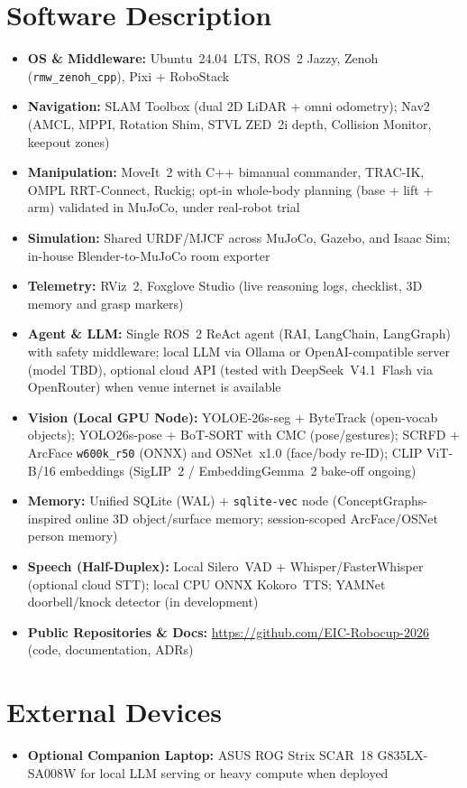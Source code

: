 \vspace{1pt}
\section*{Software Description}
\begin{itemize}[noitemsep,topsep=1pt,leftmargin=1.1em]
    \item \textbf{OS \& Middleware:} Ubuntu~24.04~LTS, ROS~2 Jazzy, Zenoh (\texttt{rmw\_zenoh\_cpp}), Pixi + RoboStack
    \item \textbf{Navigation:} SLAM Toolbox (dual 2D LiDAR + omni odometry); Nav2 (AMCL, MPPI, Rotation Shim, STVL ZED~2i depth, Collision Monitor, keepout zones)
    \item \textbf{Manipulation:} MoveIt~2 with C++ bimanual commander, TRAC-IK, OMPL RRT-Connect, Ruckig; opt-in whole-body planning (base + lift + arm) validated in MuJoCo, under real-robot trial
    \item \textbf{Simulation:} Shared URDF/MJCF across MuJoCo, Gazebo, and Isaac Sim; in-house Blender-to-MuJoCo room exporter
    \item \textbf{Telemetry:} RViz~2, Foxglove Studio (live reasoning logs, checklist, 3D memory and grasp markers)
    \item \textbf{Agent \& LLM:} Single ROS~2 ReAct agent (RAI, LangChain, LangGraph) with safety middleware; local LLM via Ollama or OpenAI-compatible server (model TBD), optional cloud API (tested with DeepSeek~V4.1~Flash via OpenRouter) when venue internet is available %
    \item \textbf{Vision (Local GPU Node):} YOLOE-26s-seg + ByteTrack (open-vocab objects); YOLO26s-pose + BoT-SORT with CMC (pose/gestures); SCRFD + ArcFace \texttt{w600k\_r50} (ONNX) and OSNet~x1.0 (face/body re-ID); CLIP ViT-B/16 embeddings (SigLIP~2 / EmbeddingGemma~2 bake-off ongoing) %
    \item \textbf{Memory:} Unified SQLite (WAL) + \texttt{sqlite-vec} node (ConceptGraphs-inspired online 3D object/surface memory; session-scoped ArcFace/OSNet person memory)
    \item \textbf{Speech (Half-Duplex):} Local Silero~VAD + Whisper/FasterWhisper (optional cloud STT); local CPU ONNX Kokoro~TTS; YAMNet doorbell/knock detector (in development) %
    \item \textbf{Public Repositories \& Docs:} \url{https://github.com/EIC-Robocup-2026} (code, documentation, ADRs)
\end{itemize}

\vspace{1pt}
\section*{External Devices}
\begin{itemize}[noitemsep,topsep=1pt,leftmargin=1.1em]
    \item \textbf{Optional Companion Laptop:} ASUS ROG Strix SCAR~18 G835LX-SA008W for local LLM serving or heavy compute when deployed %
\end{itemize}
\endgroup
